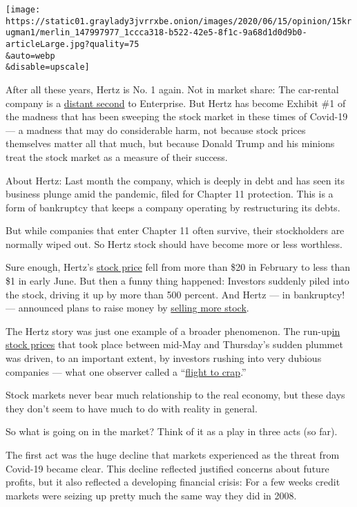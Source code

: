 \texttt{[image: https://static01.graylady3jvrrxbe.onion/images/2020/06/15/opinion/15krugman1/merlin\_147997977\_1ccca318-b522-42e5-8f1c-9a68d1d0d9b0-articleLarge.jpg?quality=75\\\&auto=webp\\\&disable=upscale]}

After all these years, Hertz is No. 1 again. Not in market share: The
car-rental company is a
\href{https://www.statista.com/statistics/1022011/car-rental-companies-market-share-united-states/}{distant
second} to Enterprise. But Hertz has become Exhibit \#1 of the madness
that has been sweeping the stock market in these times of Covid-19 --- a
madness that may do considerable harm, not because stock prices
themselves matter all that much, but because Donald Trump and his
minions treat the stock market as a measure of their success.

About Hertz: Last month the company, which is deeply in debt and has
seen its business plunge amid the pandemic, filed for Chapter 11
protection. This is a form of bankruptcy that keeps a company operating
by restructuring its debts.

But while companies that enter Chapter 11 often survive, their
stockholders are normally wiped out. So Hertz stock should have become
more or less worthless.

Sure enough, Hertz's \href{https://finance.yahoo.com/quote/HTZ/}{stock
price} fell from more than \$20 in February to less than \$1 in early
June. But then a funny thing happened: Investors suddenly piled into the
stock, driving it up by more than 500 percent. And Hertz --- in
bankruptcy! --- announced plans to raise money by
\href{https://www.marketwatch.com/story/hertz-seeks-bankruptcy-court-approval-to-offer-1-billion-in-stock-but-experts-expect-equity-to-be-wiped-out-2020-06-12}{selling
more stock}.

The Hertz story was just one example of a broader phenomenon. The
run-up\href{https://fred.stlouisfed.org/graph/fredgraph.png?g=rDaj}{in
stock prices} that took place between mid-May and Thursday's sudden
plummet was driven, to an important extent, by investors rushing into
very dubious companies --- what one observer called a
``\href{https://t.co/18VTGtR2rj?amp=1}{flight to crap}.''

Stock markets never bear much relationship to the real economy, but
these days they don't seem to have much to do with reality in general.

So what is going on in the market? Think of it as a play in three acts
(so far).

The first act was the huge decline that markets experienced as the
threat from Covid-19 became clear. This decline reflected justified
concerns about future profits, but it also reflected a developing
financial crisis: For a few weeks credit markets were seizing up pretty
much the same way they did in 2008.

